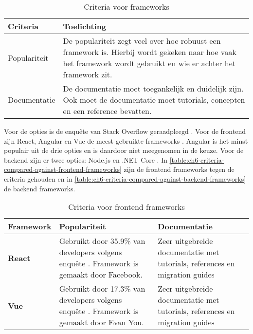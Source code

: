 \begin{table}[hbt!]
  \centering
  \caption{Criteria voor frameworks}
  \vspace*{.5\baselineskip}
  \begin{tabular}{|p{.15\linewidth}|p{.85\linewidth}|}
  \hline
  \textbf{Criteria} & \textbf{Toelichting} \\ \hline
    Populariteit
    &
    De populariteit zegt veel over hoe robuust een framework is. Hierbij wordt gekeken naar hoe vaak het framework wordt gebruikt en wie er achter het framework zit.
    \\ \hline

    Documentatie
    &
    De documentatie moet toegankelijk en duidelijk zijn. Ook moet de documentatie moet tutorials, concepten en een reference bevatten.
    \\ \hline
  \end{tabular}
  \label{table:ch6-criteria-frameworks}
\end{table}

Voor de opties is de enquête van Stack Overflow geraadpleegd \cite{stack-overflow-survey-2020}. Voor de frontend zijn React, Angular en Vue de meest gebruikte frameworks \cite{stack-overflow-survey-2020-technology-web-frameworks}. Angular is het minst populair uit de drie opties \cite{stack-overflow-survey-2020-technology-most-loved-dreaded-and-wanted-languages} en is daardoor niet meegenomen in de keuze. Voor de backend zijn er twee opties: Node.js en .NET Core \cite{stack-overflow-survey-2020-popular-framework-libraries-tools}. In \autoref{table:ch6-criteria-compared-against-frontend-frameworks} zijn de frontend frameworks tegen de criteria gehouden en in \autoref{table:ch6-criteria-compared-against-backend-frameworks} de backend frameworks.

\begin{table}[hbt!]
  \centering
  \caption{Criteria voor frontend frameworks}
  \vspace*{.5\baselineskip}
  \begin{tabular}{|p{.15\linewidth}|p{.4\linewidth}|p{.4\linewidth}|}
  \hline
  \textbf{Framework} & \textbf{Populariteit} & \textbf{Documentatie} \\ \hline
    \textbf{React} &
    Gebruikt door 35.9\% van developers volgens enquête \cite{stack-overflow-survey-2020-technology-web-frameworks}. Framework is \newline gemaakt door Facebook. &
    Zeer uitgebreide documentatie met \newline tutorials, references en migration guides \cite{reactjs-docs}
    \\ \hline
    
    \textbf{Vue} &
    Gebruikt door 17.3\% van developers volgens enquête \cite{stack-overflow-survey-2020-technology-web-frameworks}. Framework is \newline gemaakt door Evan You. & 
    Zeer uitgebreide documentatie met \newline tutorials, references en migration guides \cite{vue-docs}
    \\ \hline
  \end{tabular}
  \label{table:ch6-criteria-compared-against-frontend-frameworks}
\end{table}

